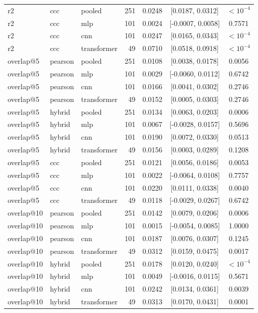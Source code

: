 \begin{longtable}{lllrrcc}
r2 & ccc & pooled & 251 & 0.0248 & [0.0187, 0.0312] & $<10^{-4}$ \\
r2 & ccc & mlp & 101 & 0.0024 & [-0.0007, 0.0058] & 0.7571 \\
r2 & ccc & cnn & 101 & 0.0247 & [0.0165, 0.0343] & $<10^{-4}$ \\
r2 & ccc & transformer & 49 & 0.0710 & [0.0518, 0.0918] & $<10^{-4}$ \\
overlap@5 & pearson & pooled & 251 & 0.0108 & [0.0038, 0.0178] & 0.0056 \\
overlap@5 & pearson & mlp & 101 & 0.0029 & [-0.0060, 0.0112] & 0.6742 \\
overlap@5 & pearson & cnn & 101 & 0.0166 & [0.0041, 0.0302] & 0.2746 \\
overlap@5 & pearson & transformer & 49 & 0.0152 & [0.0005, 0.0303] & 0.2746 \\
overlap@5 & hybrid & pooled & 251 & 0.0134 & [0.0063, 0.0203] & 0.0006 \\
overlap@5 & hybrid & mlp & 101 & 0.0067 & [-0.0028, 0.0157] & 0.5696 \\
overlap@5 & hybrid & cnn & 101 & 0.0190 & [0.0072, 0.0330] & 0.0513 \\
overlap@5 & hybrid & transformer & 49 & 0.0156 & [0.0003, 0.0289] & 0.1208 \\
overlap@5 & ccc & pooled & 251 & 0.0121 & [0.0056, 0.0186] & 0.0053 \\
overlap@5 & ccc & mlp & 101 & 0.0022 & [-0.0064, 0.0108] & 0.7757 \\
overlap@5 & ccc & cnn & 101 & 0.0220 & [0.0111, 0.0338] & 0.0040 \\
overlap@5 & ccc & transformer & 49 & 0.0118 & [-0.0029, 0.0267] & 0.6742 \\
overlap@10 & pearson & pooled & 251 & 0.0142 & [0.0079, 0.0206] & 0.0006 \\
overlap@10 & pearson & mlp & 101 & 0.0015 & [-0.0054, 0.0085] & 1.0000 \\
overlap@10 & pearson & cnn & 101 & 0.0187 & [0.0076, 0.0307] & 0.1245 \\
overlap@10 & pearson & transformer & 49 & 0.0312 & [0.0159, 0.0475] & 0.0017 \\
overlap@10 & hybrid & pooled & 251 & 0.0178 & [0.0120, 0.0240] & $<10^{-4}$ \\
overlap@10 & hybrid & mlp & 101 & 0.0049 & [-0.0016, 0.0115] & 0.5671 \\
overlap@10 & hybrid & cnn & 101 & 0.0242 & [0.0134, 0.0361] & 0.0039 \\
overlap@10 & hybrid & transformer & 49 & 0.0313 & [0.0170, 0.0431] & 0.0001 \\

\end{longtable}
